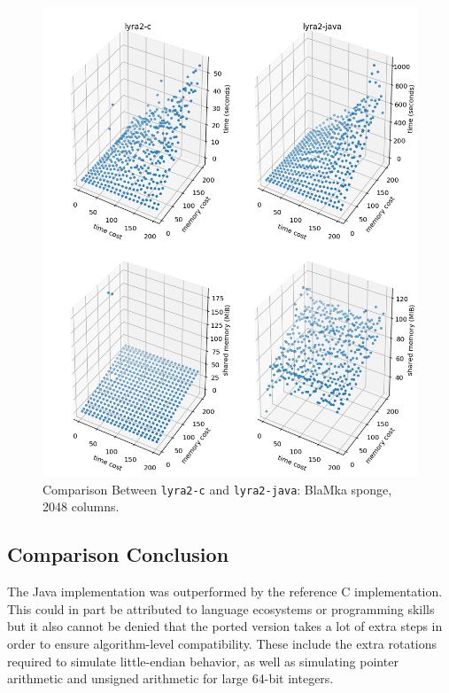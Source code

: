 \begin{figure}[p]
    \centering
    \includegraphics[width=\linewidth,keepaspectratio]{figures/tcost_mcost_blamka_2048}
    \caption{Comparison Between \texttt{lyra2-c} and \texttt{lyra2-java}: BlaMka sponge, 2048 columns.}
    \label{figure:tcost_mcost_blamka_2048}
\end{figure}

\clearpage
\subsection{Comparison Conclusion}
\label{sec:comparison-conclusion}

The Java implementation was outperformed by the reference C implementation. This could in part be attributed to language ecosystems or programming skills but it also cannot be denied that the ported version takes a lot of extra steps in order to ensure algorithm-level compatibility. These include the extra rotations required to simulate little-endian behavior, as well as simulating pointer arithmetic and unsigned arithmetic for large 64-bit integers.

